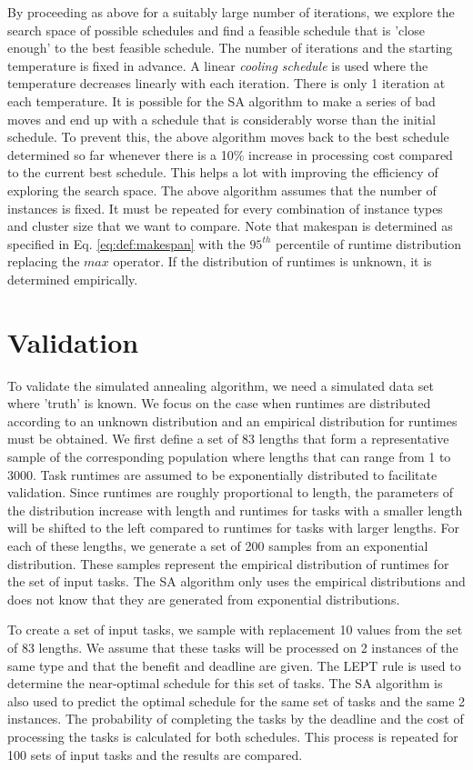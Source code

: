 \documentclass[12pt]{report}
\begin{document}
By proceeding as above for a suitably large number of iterations, we explore the search space of possible schedules and find a feasible schedule that is 'close enough' to the best feasible schedule. 
The number of iterations and the starting temperature is fixed in advance.
A linear \textit{cooling schedule} is used where the temperature decreases linearly with each iteration.
There is only 1 iteration at each temperature. 
It is possible for the SA algorithm to make a series of bad moves and end up with a schedule that is considerably worse than the initial schedule.
To prevent this, the above algorithm moves back to the best schedule determined so far whenever there is a 10\% increase in processing cost compared to the current best schedule.
This helps a lot with improving the efficiency of exploring the search space.
The above algorithm assumes that the number of instances is fixed.
It must be repeated for every combination of instance types and cluster size that we want to compare.
Note that makespan is determined as specified in Eq. \ref{eq:def:makespan} with the $95^{th}$ percentile of runtime distribution replacing the $max$ operator.
If the distribution of runtimes is unknown, it is determined empirically.


\section{Validation}

To validate the simulated annealing algorithm, we need a simulated data set where 'truth' is known.
We focus on the case when runtimes are distributed according to an unknown distribution and an empirical distribution for runtimes must be obtained.
We first define a set of 83 lengths that form a representative sample of the corresponding population where lengths that can range from 1 to 3000.
Task runtimes are assumed to be exponentially distributed to facilitate validation.
Since runtimes are roughly proportional to length, the parameters of the distribution increase with length and runtimes for tasks with a smaller length will be shifted to the left compared to runtimes for tasks with larger lengths.
For each of these lengths, we generate a set of 200 samples from an exponential distribution.
These samples represent the empirical distribution of runtimes for the set of input tasks. 
The SA algorithm only uses the empirical distributions and does not know that they are generated from exponential distributions.

To create a set of input tasks, we sample with replacement 10 values from the set of 83 lengths.
We assume that these tasks will be processed on 2 instances of the same type and that the benefit and deadline are given.
The LEPT rule is used to determine the near-optimal schedule for this set of tasks.
The SA algorithm is also used to predict the optimal schedule for the same set of tasks and the same 2 instances.
The probability of completing the tasks by the deadline and the cost of processing the tasks is calculated for both schedules.
This process is repeated for 100 sets of input tasks and the results are compared.
\end{document}
